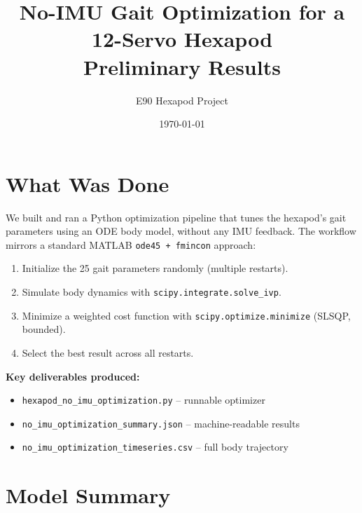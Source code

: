 \documentclass[11pt]{article}
\title{No-IMU Gait Optimization for a 12-Servo Hexapod\\[4pt]
\large Preliminary Results}
\author{E90 Hexapod Project}
\date{\today}
\begin{document}
\maketitle

\section{What Was Done}

We built and ran a Python optimization pipeline that tunes the hexapod's gait parameters using an ODE body model, without any IMU feedback. The workflow mirrors a standard MATLAB \texttt{ode45\,+\,fmincon} approach:

\begin{enumerate}
    \item Initialize the 25 gait parameters randomly (multiple restarts).
    \item Simulate body dynamics with \texttt{scipy.integrate.solve\_ivp}.
    \item Minimize a weighted cost function with \texttt{scipy.optimize.minimize} (SLSQP, bounded).
    \item Select the best result across all restarts.
\end{enumerate}

\noindent\textbf{Key deliverables produced:}
\begin{itemize}
    \item \texttt{hexapod\_no\_imu\_optimization.py} -- runnable optimizer
    \item \texttt{no\_imu\_optimization\_summary.json} -- machine-readable results
    \item \texttt{no\_imu\_optimization\_timeseries.csv} -- full body trajectory
\end{itemize}

\section{Model Summary}
\end{document}
